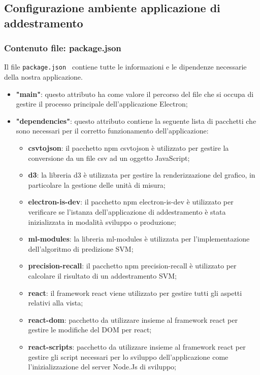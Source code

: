 \subsection{Configurazione ambiente applicazione di addestramento}
\subsubsection{Contenuto file: package.json}
Il file \verb|package.json | contiene tutte le informazioni e le dipendenze necessarie della nostra applicazione.
\begin{itemize}
    \item \textbf{"main"}: questo attributo ha come valore il percorso del file che si occupa di gestire il processo principale dell'applicazione Electron;
    \item \textbf{"dependencies"}: questo attributo contiene la seguente lista di pacchetti che sono necessari per il corretto funzionamento dell'applicazione:
        \begin{itemize}
            \item \textbf{csvtojson}: il pacchetto npm csvtojson è utilizzato per gestire la conversione da un file csv ad un oggetto JavaScript;
            \item \textbf{d3}: la libreria d3 è utilizzata per gestire la renderizzazione del grafico, in particolare la gestione delle unità di misura;
            \item \textbf{electron-is-dev}: il pacchetto npm electron-is-dev è utilizzato per verificare se l'istanza dell'applicazione di addestramento è stata inizializzata in modalità sviluppo o produzione;
            \item \textbf{ml-modules}: la libreria ml-modules è utilizzata per l'implementazione dell'algoritmo di predizione SVM\glo;
            \item \textbf{precision-recall}: il pacchetto npm precision-recall è utilizzato per calcolare il risultato di un addestramento SVM\glo;
            \item \textbf{react}: il framework react viene utilizzato per gestire tutti gli aspetti relativi alla vista;
            \item \textbf{react-dom}: pacchetto da utilizzare insieme al framework react per gestire le modifiche del DOM per react;
            \item \textbf{react-scripts}: pacchetto da utilizzare insieme al framework react per gestire gli script necessari per lo sviluppo dell'applicazione come l'inizializzazione del server Node.Js di sviluppo;

\end{itemize}
\end{itemize}

